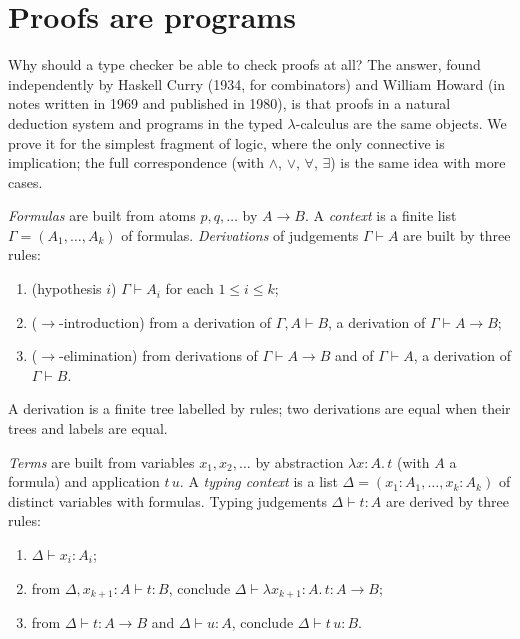 \section{Proofs are programs}
\label{sec:curryhoward}

Why should a type checker be able to check proofs at all? The answer, found independently by Haskell Curry (1934, for combinators) and William Howard (in notes written in 1969 and
published in 1980), is that proofs in a natural deduction system and programs in the typed $\lambda$-calculus are the same objects. We prove it for the simplest fragment of logic, where
the only connective is implication; the full correspondence (with $\wedge$, $\vee$, $\forall$, $\exists$) is the same idea with more cases.

\begin{definition}\label{def:nd}
\emph{Formulas} are built from atoms $p,q,\dots$ by $A\to B$. A \emph{context} is a finite list $\Gamma=(A_1,\dots,A_k)$ of formulas. \emph{Derivations} of judgements $\Gamma\vdash A$ are built by three rules:
\begin{enumerate}[label=(\roman*)]
\item (hypothesis $i$) $\Gamma\vdash A_i$ for each $1\le i\le k$;
\item ($\to$-introduction) from a derivation of $\Gamma,A\vdash B$, a derivation of $\Gamma\vdash A\to B$;
\item ($\to$-elimination) from derivations of $\Gamma\vdash A\to B$ and of $\Gamma\vdash A$, a derivation of $\Gamma\vdash B$.
\end{enumerate}
A derivation is a finite tree labelled by rules; two derivations are equal when their trees and labels are equal.
\end{definition}

\begin{definition}\label{def:stlc}
\emph{Terms} are built from variables $x_1,x_2,\dots$ by abstraction $\lambda x{:}A.\,t$ (with $A$ a formula) and application $t\,u$. A \emph{typing context} is a list $\Delta=(x_1{:}A_1,\dots,x_k{:}A_k)$
of distinct variables with formulas. Typing judgements $\Delta\vdash t:A$ are derived by three rules:
\begin{enumerate}[label=(\roman*)]
\item $\Delta\vdash x_i:A_i$;
\item from $\Delta,x_{k+1}{:}A\vdash t:B$, conclude $\Delta\vdash\lambda x_{k+1}{:}A.\,t:A\to B$;
\item from $\Delta\vdash t:A\to B$ and $\Delta\vdash u:A$, conclude $\Delta\vdash t\,u:B$.
\end{enumerate}
\end{definition}

